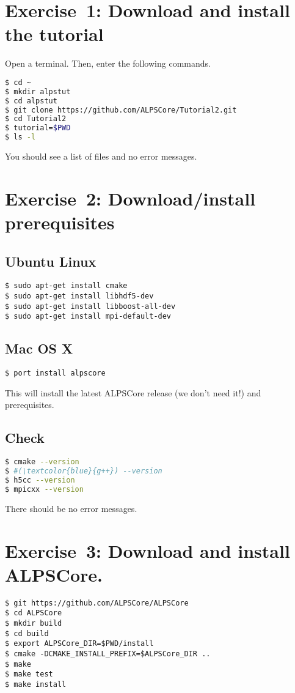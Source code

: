 \documentclass[12pt]{article}
\begin{document}
\section*{Exercise~1: Download and install the tutorial}

Open a terminal. Then, enter the following commands.

\begin{lstlisting}[language=sh,emph={ls,cd,mkdir,git}]
$ cd ~
$ mkdir alpstut
$ cd alpstut
$ git clone https://github.com/ALPSCore/Tutorial2.git
$ cd Tutorial2
$ tutorial=$PWD
$ ls -l
\end{lstlisting}

You should see a list of files and no error messages.

\section*{Exercise~2: Download/install prerequisites}
\subsection*{Ubuntu Linux}
\begin{lstlisting}[emph={sudo,apt,get}]
$ sudo apt-get install cmake
$ sudo apt-get install libhdf5-dev
$ sudo apt-get install libboost-all-dev
$ sudo apt-get install mpi-default-dev
\end{lstlisting}%
\subsection*{Mac OS X}
\begin{lstlisting}[emph={port}]
$ port install alpscore
\end{lstlisting}%
This will install the latest ALPSCore release (we don't need it!)
and prerequisites.

\subsection*{Check}
\begin{lstlisting}[language=sh,basicstyle=\ttfamily\small,emph={cmake,gcc,h5cc,mpicxx}]
$ cmake --version
$ #(\textcolor{blue}{g++}) --version
$ h5cc --version
$ mpicxx --version
\end{lstlisting}

There should be no error messages.

\section*{Exercise~3: Download and install ALPSCore.}
\begin{lstlisting}[emph={git,export,cmake,make,cd,mkdir}]
$ git https://github.com/ALPSCore/ALPSCore
$ cd ALPSCore
$ mkdir build
$ cd build
$ export ALPSCore_DIR=$PWD/install
$ cmake -DCMAKE_INSTALL_PREFIX=$ALPSCore_DIR ..
$ make
$ make test
$ make install
\end{lstlisting}%
\end{document}

